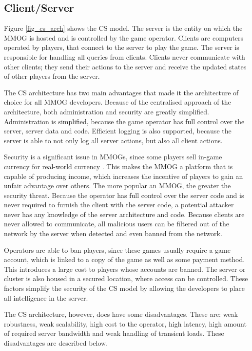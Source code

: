\documentclass[10pt,a4paper,journal,cspaper,compsoc]{IEEEtran}
\begin{document}
\subsection{Client/Server}
\label{client_server_network_model}

Figure \ref{fig_cs_arch} shows the \ac{CS} model. The server is the entity on which the MMOG is hosted and is controlled by the game operator.
Clients are computers operated by players, that connect to the server to play the game. The server is responsible for handling all queries from
clients. Clients never communicate with other clients; they send their actions to the server and receive the updated states of other players from the
server.

The \ac{CS} architecture has two main advantages that made it the architecture of choice for all MMOG developers. Because of the centralised approach
of the architecture, both administration and security are greatly simplified. Administration is simplified, because the game operator has full
control over the server, server data and code. Efficient logging is also supported, because the server is able to not only log all server actions,
but also all client actions.

Security is a significant issue in MMOGs, since some players sell in-game currency for real-world currency \cite{chinese_gold_farmer}. This makes the
MMOG a platform that is capable of producing income, which increases the incentive of players to gain an unfair advantage over others. The more
popular an MMOG, the greater the security threat. Because the operator has full control over the server code and is never required to furnish the
client with the server code, a potential attacker never has any knowledge of the server architecture and code. Because clients are never allowed to
communicate, all malicious users can be filtered out of the network by the server when detected and even banned from the network.

Operators are able to ban players, since these games usually require a game account, which is linked to a copy of the game as well as some payment
method. This introduces a large cost to players whose accounts are banned. The server or cluster is also housed in a secured location, where access
can be controlled. These factors simplify the security of the \ac{CS} model by allowing the developers to place all intelligence in the server.

The \ac{CS} architecture, however, does have some disadvantages. These are: weak robustness, weak scalability, high cost to the operator, high
latency, high amount of required server bandwidth and weak handling of transient loads. These disadvantages are described below.
\end{document}
